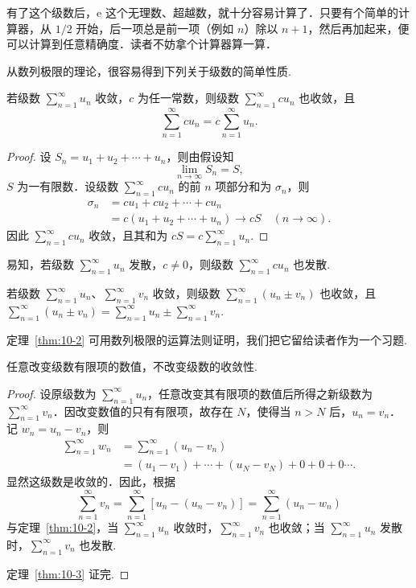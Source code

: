 有了这个级数后，$\mathrm{e}$ 这个无理数、超越数，就十分容易计算了．只要有个简单的计算器，从 $1/2$ 开始，后一项总是前一项（例如 $n$）除以 $n+1$，然后再加起来，便可以计算到任意精确度．读者不妨拿个计算器算一算．

从数列极限的理论，很容易得到下列关于级数的简单性质.

\begin{theorem}\label{thm:10-1}
若级数 $\sum_{n=1}^{\infty}u_{n}$ 收敛，$c$ 为任一常数，则级数 $\sum_{n=1}^{\infty}cu_{n}$ 也收敛，且
\[
\sum_{n=1}^{\infty}cu_{n}=c\sum_{n=1}^{\infty}u_{n}.
\]
\end{theorem}

\begin{proof}
设 $S_{n}=u_{1}+u_{2}+\cdots+u_{n}$，则由假设知
\[
\lim_{n\to\infty}S_{n}=S,
\]
$S$ 为一有限数．设级数 $\sum_{n=1}^{\infty}cu_{n}$ 的前 $n$ 项部分和为 $\sigma_{n}$，则
\[
\begin{aligned}
\sigma_{n}&=cu_{1}+cu_{2}+\cdots+cu_{n}\\
&=c(u_{1}+u_{2}+\cdots+u_{n})\to cS\quad(n\to\infty).
\end{aligned}
\]
因此 $\sum_{n=1}^{\infty}cu_{n}$ 收敛，且其和为 $cS=c\sum_{n=1}^{\infty}u_{n}$.
\end{proof}

易知，若级数 $\sum_{n=1}^{\infty}u_{n}$ 发散，$c\neq0$，则级数 $\sum_{n=1}^{\infty}cu_{n}$ 也发散.

\begin{theorem}\label{thm:10-2}
若级数 $\sum_{n=1}^{\infty}u_{n}$、$\sum_{n=1}^{\infty}v_{n}$ 收敛，则级数 $\sum_{n=1}^{\infty}(u_{n}\pm v_{n})$ 也收敛，且 $\displaystyle\sum_{n=1}^{\infty}(u_{n}\pm v_{n})=\sum_{n=1}^{\infty}u_{n}\pm\sum_{n=1}^{\infty}v_{n}$.
\end{theorem}

定理~\ref{thm:10-2} 可用数列极限的运算法则证明，我们把它留给读者作为一个习题.

\begin{theorem}\label{thm:10-3}
任意改变级数有限项的数值，不改变级数的收敛性.
\end{theorem}

\begin{proof}
设原级数为 $\sum_{n=1}^{\infty}u_{n}$，任意改变其有限项的数值后所得之新级数为 $\sum_{n=1}^{\infty}v_{n}$．因改变数值的只有有限项，故存在 $N$，使得当 $n>N$ 后，$u_{n}=v_{n}$．记 $w_{n}=u_{n}-v_{n}$，则
\[
\begin{aligned}
\sum_{n=1}^{\infty}w_{n}&=\sum_{n=1}^{\infty}(u_{n}-v_{n})\\
&=(u_{1}-v_{1})+\cdots+(u_{N}-v_{N})+0+0+0\cdots.
\end{aligned}
\]
显然这级数是收敛的．因此，根据
\[
\sum_{n=1}^{\infty}v_{n}=\sum_{n=1}^{\infty}\left[u_{n}-(u_{n}-v_{n})\right]=\sum_{n=1}^{\infty}(u_{n}-w_{n})
\]
与定理~\ref{thm:10-2}，当 $\sum_{n=1}^{\infty}u_{n}$ 收敛时，$\sum_{n=1}^{\infty}v_{n}$ 也收敛；当 $\sum_{n=1}^{\infty}u_{n}$ 发散时，$\sum_{n=1}^{\infty}v_{n}$ 也发散.

定理~\ref{thm:10-3} 证完.
\end{proof}

